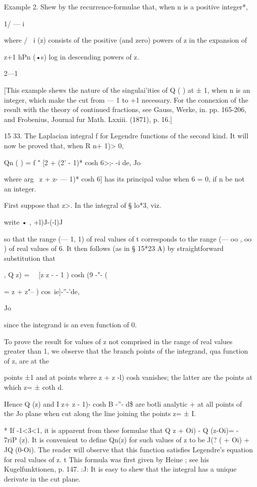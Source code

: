 {{Example 2. Shew by the recurrence-formulae that, when n is a positive integer*, 

 1/ — i 

where / \ i (z) consists of the positive (and zero) powers of z in the expansion of 

z+1 
hPn (•s) log in descending powers of z. 

2—1 

[This example shews the nature of the singulai'ities of Q  ( ) at ± 1, when n is an integer, 
which make the cut from — 1 to +1 necessary. For the connexion of the result with 
the theory of continued fractions, see Gauss, Werke, in. pp. 165-206, and Frobenius, 
Journal fur Math. Lxxiii. (1871), p. 16.] 

15 33. The Laplacian integral f for Legendre functions of the second kind. 
It will now be proved that, when R  n+ 1)> 0, 

Qn ( ) = f " [2 + (2' - 1)* cosh 6>;- -i de, 
Jo 

where arg \ z +  z- — 1)* cosh 6] has its principal value when 6 = 0, if n be not 
an integer. 

First suppose that z>.  In the integral of § lo*3, viz. 

write • ,  +l)J-(-l)J  

so that the range (— 1, 1) of real values of t corresponds to the range (— oo , oo ) 
of real values of 6. It then follows (as in § 15*23 A) by straightforward 
substitution that 



, Q  z) = \ \  [z   z - - 1 )  cosh (9 -"- ( 

=  z +  z"-- )  cos\ ie]-''-'de, 

Jo 



since the integrand is an even function of 0. 

To prove the result for values of z not comprised in the range of real values greater 
than 1, we observe that the branch points of the integrand, qua function of z, are at the 

points ±1 and at points where z +  z -l)  cosh  vanishes; the latter are the points at 
which z= ± coth d. 

Hence Q  (z) and I  z+  z  - 1)- cosh B -''- d\$ are botli analytic + at all points of the 
Jo 
plane when cut along the line joining the points z= ± I. 

* If -1<3<1, it is apparent from these formulae that Q  z + Oi) - Q (z-Oi)= - 7riP (z). 
It is convenient to define Qn(z) for such values of z to be J(? (  + Oi) + JQ (0-Oi). The 
reader will observe that this function satisfies Legendre's equation for real values of z. 
t This formula was first given by Heine ; see his Kugelfunktionen, p. 147. 
:J: It is easy to shew that the integral has a unique derivate in the cut plane. 



}}
